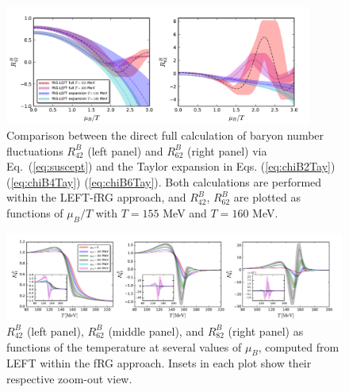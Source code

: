 \documentclass[%
reprint,
superscriptaddress,
showpacs,preprintnumbers,
 amsmath,amssymb,
 aps,
prd,
]{revtex4-1}
\def\Eq#1{Eq.~(\ref{#1})}
\begin{document}
%
\begin{figure}[t]
\includegraphics[width=0.9\textwidth]{R42R62expansion-muBoT}
\caption{Comparison between the direct full calculation of baryon number fluctuations $R^{B}_{42}$ (left panel) and $R^{B}_{62}$ (right panel) via \Eq{eq:suscept} and the Taylor expansion in Eqs. (\ref{eq:chiB2Tay})  (\ref{eq:chiB4Tay})  (\ref{eq:chiB6Tay}). Both calculations are performed within the LEFT-fRG approach, and $R^{B}_{42}$, $R^{B}_{62}$ are plotted as functions of $\mu_B/T$ with $T=155$ MeV and $T=160$ MeV.}\label{fig:R42R62expansion-muBoT}
\end{figure}
%

%
\begin{figure}[t]
\includegraphics[width=1.\textwidth]{R42R62R82-T-muB0to400}
\caption{$R^{B}_{42}$ (left panel), $R^{B}_{62}$ (middle panel), and $R^{B}_{82}$ (right panel) as functions of the temperature at several values of $\mu_B$, computed from LEFT within the fRG approach. Insets in each plot show their respective zoom-out view.}\label{fig:R42R62R82-T-muB0to400}
\end{figure}
%
\end{document}
